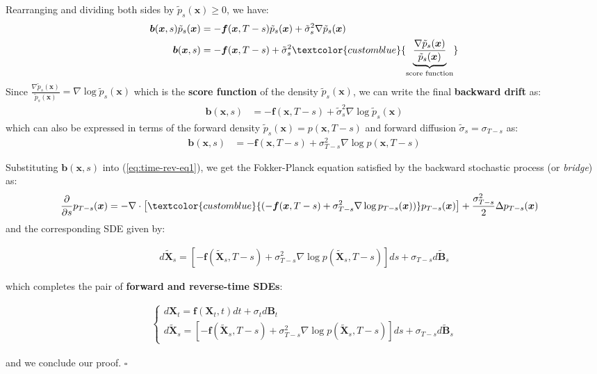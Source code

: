 \documentclass{article}
\newcommand{\boldtext}[1]{\textbf{\textcolor{MyGreen}{#1}}}
\newcommand{\bluetext}[1]{\textcolor{customblue}{#1}}
\begin{document}
Rearranging and dividing both sides by $\tilde{p}_s(\boldsymbol{x})\geq 0$, we have:
\begin{align}
    \boldsymbol{b}(\boldsymbol{x},s)\tilde{p}_s(\boldsymbol{x}) &=-\boldsymbol{f}(\boldsymbol{x},T-s)\tilde{p}_s(\boldsymbol{x})+\tilde{\sigma}_s^2\nabla \tilde{p}_s(\boldsymbol{x})\nonumber\\
    \boldsymbol{b}(\boldsymbol{x},s) &=-\boldsymbol{f}(\boldsymbol{x},T-s)+\tilde{\sigma}_s^2\bluetext{\underbrace{\frac{\nabla \tilde{p}_s(\boldsymbol{x})}{\tilde{p}_s(\boldsymbol{x})}}_{\text{score function}}}
\end{align}
\noindent Since $\frac{\nabla \tilde{p}_s(\boldsymbol{x})}{\tilde{p}_s(\boldsymbol{x})}=\nabla\log \tilde{p}_s(\boldsymbol{x})$ which is the \boldtext{score function} of the density $\tilde{p}_s(\boldsymbol{x})$, we can write the final \textbf{backward drift} as:
\begin{align}
    \boldsymbol{b}(\boldsymbol{x},s) &=-\boldsymbol{f}(\boldsymbol{x},T-s)+\tilde{\sigma}_s^2\nabla\log \tilde{p}_s(\boldsymbol{x})
\end{align}
which can also be expressed in terms of the forward density $\tilde{p}_s(\boldsymbol{x})=p(\boldsymbol{x},T-s)$ and forward diffusion $\tilde{\sigma}_s=\sigma_{T-s}$ as:
\begin{align}
    \boldsymbol{b}(\boldsymbol{x},s) &=-\boldsymbol{f}(\boldsymbol{x},T-s)+\sigma_{T-s}^2\nabla\log p(\boldsymbol{x},T-s)
\end{align}

Substituting $\boldsymbol{b}(\boldsymbol{x},s)$ into (\ref{eq:time-rev-eq1}), we get the Fokker-Planck equation satisfied by the backward stochastic process (or \textit{bridge}) as:
\begin{align}
    \frac{\partial}{\partial s}p_{T-s}(\boldsymbol{x})&=-\nabla\cdot\big[\bluetext{(-\boldsymbol{f}(\boldsymbol{x},T-s)+\sigma_{T-s}^2\nabla\log p_{T-s}(\boldsymbol{x}))}p_{T-s}(\boldsymbol{x})\big]+\frac{\sigma_{T-s}^2}{2}\Delta p_{T-s}(\boldsymbol{x})
\end{align}
and the corresponding SDE given by:
\begin{small}
\begin{align}
    d\tilde{\boldsymbol{X}}_s=\left[-\boldsymbol{f}(\tilde{\boldsymbol{X}}_s,T-s)+\sigma_{T-s}^2\nabla\log p(\tilde{\boldsymbol{X}}_s,T-s)\right]ds+\sigma_{T-s}d\widetilde{\boldsymbol{B}}_s\nonumber
\end{align}
\end{small}
which completes the pair of \boldtext{forward and reverse-time SDEs}:
\begin{small}
\begin{align}
    \begin{cases}
        d\boldsymbol{X}_t=\boldsymbol{f}(\boldsymbol{X}_t, t)dt+\sigma_td\boldsymbol{B}_t\\
        d\tilde{\boldsymbol{X}}_s=\left[-\boldsymbol{f}(\tilde{\boldsymbol{X}}_s,T-s)+\sigma_{T-s}^2\nabla\log p(\tilde{\boldsymbol{X}}_s,T-s)\right]ds+\sigma_{T-s}d\widetilde{\boldsymbol{B}}_s
    \end{cases}
\end{align}
\end{small}
and we conclude our proof. \hfill $\square$
\end{document}
